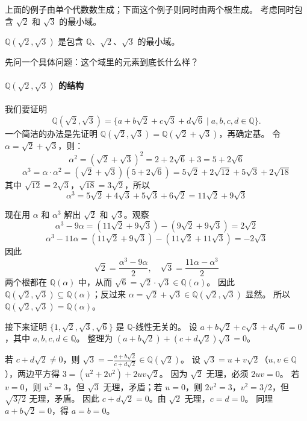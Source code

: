 上面的例子由单个代数数生成；下面这个例子则同时由两个根生成。
考虑同时包含 $\sqrt{2}$ 和 $\sqrt{3}$ 的最小域。

$\mathbb{Q}(\sqrt{2}, \sqrt{3})$ 是包含 $\mathbb{Q}$、$\sqrt{2}$、$\sqrt{3}$ 的最小域。

先问一个具体问题：这个域里的元素到底长什么样？

\paragraph*{$\mathbb{Q}(\sqrt{2}, \sqrt{3})$ 的结构}
我们要证明
\[\mathbb{Q}(\sqrt{2}, \sqrt{3}) = \{a + b\sqrt{2} + c\sqrt{3} + d\sqrt{6} \mid a,b,c,d \in \mathbb{Q}\}.\]
一个简洁的办法是先证明 $\mathbb{Q}(\sqrt{2}, \sqrt{3}) = \mathbb{Q}(\sqrt{2} + \sqrt{3})$，再确定基。
令 $\alpha = \sqrt{2} + \sqrt{3}$，则：
\[\alpha^2 = (\sqrt{2} + \sqrt{3})^2 = 2 + 2\sqrt{6} + 3 = 5 + 2\sqrt{6}\]
\[\alpha^3 = \alpha \cdot \alpha^2 = (\sqrt{2} + \sqrt{3})(5 + 2\sqrt{6}) = 5\sqrt{2} + 2\sqrt{12} + 5\sqrt{3} + 2\sqrt{18}\]
其中 $\sqrt{12} = 2\sqrt{3}$，$\sqrt{18} = 3\sqrt{2}$，所以
\[\alpha^3 = 5\sqrt{2} + 4\sqrt{3} + 5\sqrt{3} + 6\sqrt{2} = 11\sqrt{2} + 9\sqrt{3}\]

现在用 $\alpha$ 和 $\alpha^3$ 解出 $\sqrt{2}$ 和 $\sqrt{3}$。观察
\[\alpha^3 - 9\alpha = (11\sqrt{2} + 9\sqrt{3}) - (9\sqrt{2} + 9\sqrt{3}) = 2\sqrt{2}\]
\[\alpha^3 - 11\alpha = (11\sqrt{2} + 9\sqrt{3}) - (11\sqrt{2} + 11\sqrt{3}) = -2\sqrt{3}\]
因此
\[\sqrt{2} = \frac{\alpha^3 - 9\alpha}{2}, \quad \sqrt{3} = \frac{11\alpha - \alpha^3}{2}\]
两个根都在 $\mathbb{Q}(\alpha)$ 中，从而 $\sqrt{6} = \sqrt{2} \cdot \sqrt{3} \in \mathbb{Q}(\alpha)$。
因此 $\mathbb{Q}(\sqrt{2}, \sqrt{3}) \subseteq \mathbb{Q}(\alpha)$；反过来 $\alpha = \sqrt{2} + \sqrt{3} \in \mathbb{Q}(\sqrt{2}, \sqrt{3})$ 显然。
所以 $\mathbb{Q}(\sqrt{2}, \sqrt{3}) = \mathbb{Q}(\alpha)$。

接下来证明 $\{1, \sqrt{2}, \sqrt{3}, \sqrt{6}\}$ 是 $\mathbb{Q}$-线性无关的。
设 $a + b\sqrt{2} + c\sqrt{3} + d\sqrt{6} = 0$，其中 $a, b, c, d \in \mathbb{Q}$。
整理为 $(a + b\sqrt{2}) + (c + d\sqrt{2})\sqrt{3} = 0$。

若 $c + d\sqrt{2} \neq 0$，则 $\sqrt{3} = -\frac{a + b\sqrt{2}}{c + d\sqrt{2}} \in \mathbb{Q}(\sqrt{2})$。
设 $\sqrt{3} = u + v\sqrt{2}$（$u, v \in \mathbb{Q}$），两边平方得 $3 = (u^2 + 2v^2) + 2uv\sqrt{2}$。
因为 $\sqrt{2}$ 无理，必须 $2uv = 0$。
若 $v = 0$，则 $u^2 = 3$，但 $\sqrt{3}$ 无理，矛盾；若 $u = 0$，则 $2v^2 = 3$，$v^2 = 3/2$，但 $\sqrt{3/2}$ 无理，矛盾。
因此 $c + d\sqrt{2} = 0$。由 $\sqrt{2}$ 无理，$c = d = 0$。
同理 $a + b\sqrt{2} = 0$，得 $a = b = 0$。

